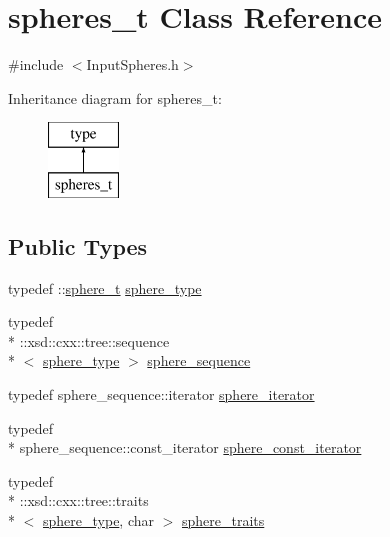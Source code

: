 \hypertarget{classspheres__t}{\section{spheres\-\_\-t Class Reference}
\label{classspheres__t}
}


{\ttfamily \#include $<$Input\-Spheres.\-h$>$}

Inheritance diagram for spheres\-\_\-t\-:\begin{figure}[H]
\begin{center}
\leavevmode
\includegraphics[height=2.000000cm]{classspheres__t}
\end{center}
\end{figure}
\subsection*{Public Types}
\begin{DoxyCompactItemize}
\item 
typedef \-::\hyperlink{classsphere__t}{sphere\-\_\-t} \hyperlink{classspheres__t_a206f1776b61d2342bf0bd21629d2a690}{sphere\-\_\-type}
\item 
typedef \\*
\-::xsd\-::cxx\-::tree\-::sequence\\*
$<$ \hyperlink{classspheres__t_a206f1776b61d2342bf0bd21629d2a690}{sphere\-\_\-type} $>$ \hyperlink{classspheres__t_ae9b4b35c1b290ab0ce8724f773d3b553}{sphere\-\_\-sequence}
\item 
typedef sphere\-\_\-sequence\-::iterator \hyperlink{classspheres__t_a9c45b4a3d0428ab6cb8e7a5d7baf06aa}{sphere\-\_\-iterator}
\item 
typedef \\*
sphere\-\_\-sequence\-::const\-\_\-iterator \hyperlink{classspheres__t_ac87f4dc7dafc3f09566e157ef3cf9985}{sphere\-\_\-const\-\_\-iterator}
\item 
typedef \\*
\-::xsd\-::cxx\-::tree\-::traits\\*
$<$ \hyperlink{classspheres__t_a206f1776b61d2342bf0bd21629d2a690}{sphere\-\_\-type}, char $>$ \hyperlink{classspheres__t_aa9e5c761af0e467b7de444613c67d826}{sphere\-\_\-traits}
\end{DoxyCompactItemize}
